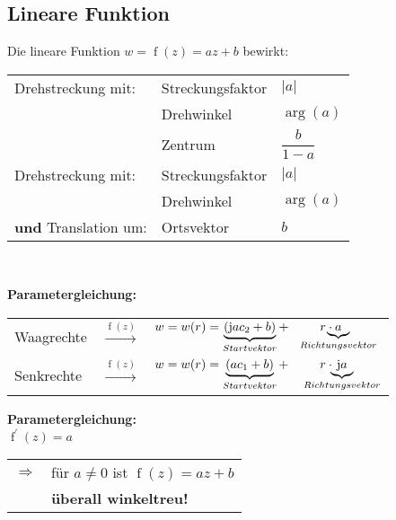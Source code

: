 \subsection{Lineare Funktion}
	\begin{minipage}[t]{0.5\textwidth}
		
	\end{minipage}
	\begin{minipage}[t]{0.5\textwidth}
		Die lineare Funktion $w = \operatorname{f}\left( z \right) = a z + b$ bewirkt:\\[3pt]
		\renewcommand{\arraystretch}{1.7}
		\begin{tabular}{|lll|}
			\hline
			Drehstreckung mit: & Streckungsfaktor & $\left|a\right|$\\
	 & Drehwinkel & $\operatorname{arg}\left( a \right)$\\
	 & Zentrum & $\dfrac{b}{1-a}$\\[6pt]
			\hline
			Drehstreckung mit: & Streckungsfaktor & $\left|a\right|$\\
			& Drehwinkel & $\operatorname{arg}\left( a \right)$\\
			\textbf{und} Translation um: & Ortsvektor & $b$\\
			\hline
		\end{tabular}
	\renewcommand{\arraystretch}{1}
	\end{minipage}\\[3pt]
	\begin{minipage}[t]{0.7\textwidth}
		\textbf{Parametergleichung:}\\[3pt]
		\begin{tabular}{lcl}
			Waagrechte & $\xrightarrow[]{\operatorname{f}\left( z \right)}$ & $w = w(r) = \underbrace{\left( \mathrm{j} a c_2 + b \right)}_{Startvektor} + \hspace{25pt} r \cdot \hspace{-28pt} \underbrace{a}_{Richtungsvektor}$\\[3pt]
			Senkrechte & $\xrightarrow[]{\operatorname{f}\left( z \right)}$ & $w = w(r) = \underbrace{\left( a c_1 + b \right)}_{Startvektor} + \hspace{25pt} r \cdot \hspace{-25pt} \underbrace{\mathrm{j}a}_{Richtungsvektor}$\\[3pt]
		\end{tabular}
	\end{minipage}
	\begin{minipage}[t]{0.3\textwidth}
		\textbf{Parametergleichung:}\\[3pt]
		$\operatorname{f}^{\prime}\left( z \right) = a$\\[3pt]
		\begin{tabular}{ll}
			$\Rightarrow$ & für $a \neq 0$ ist $\operatorname{f}\left( z \right) = a z + b$\\[3pt]
	 & \textbf{überall winkeltreu!}
		\end{tabular}
	\end{minipage}

